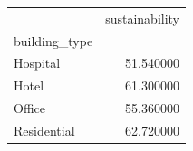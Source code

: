 \begin{tabular}{lr}
 & sustainability \\
building_type &  \\
Hospital & 51.540000 \\
Hotel & 61.300000 \\
Office & 55.360000 \\
Residential & 62.720000 \\
\end{tabular}
